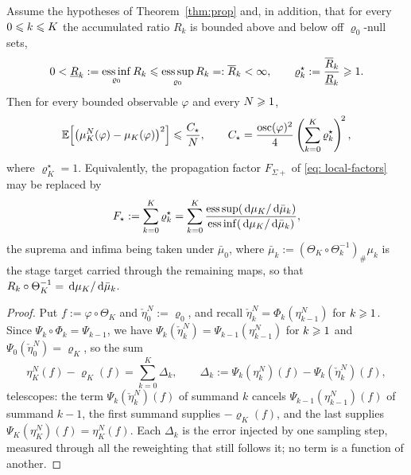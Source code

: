 \documentclass{article}
\begin{document}
{\begin{theorem}
\label{thm:prop-star}
Assume the hypotheses of Theorem~\ref{thm:prop} and, in addition, that for every $0\leqslant k\leqslant K$ the accumulated ratio $R_k$ is bounded above and below off $\varrho_0$-null sets,
\begin{equation*}
    0<\underline R_k:=\operatorname*{ess\,inf}_{\varrho_0}R_k
    \leqslant \operatorname*{ess\,sup}_{\varrho_0}R_k=:\overline R_k<\infty,
    \qquad
    \varrho^\star_k:=\frac{\overline R_k}{\underline R_k}\geqslant1 .
\end{equation*}
Then for every bounded observable $\varphi$ and every $N\geqslant1$,
\begin{equation}
    \mathbb E\Bigl[\bigl(\mu_K^N(\varphi)-\mu_K(\varphi)\bigr)^2\Bigr]\leqslant\frac{C_\star}{N},
    \qquad
    C_\star=\frac{\operatorname{osc}(\varphi)^2}{4}\left(\sum_{k=0}^{K}\varrho^\star_k\right)^{\!2},
    \label{eq: propagation-bound-star}
\end{equation}
where $\varrho^\star_K=1$. Equivalently, the propagation factor $F_{\Sigma+}$ of \eqref{eq: local-factors} may be replaced by
\begin{equation*}
    F_\star:=\sum_{k=0}^{K}\varrho^\star_k
    =\sum_{k=0}^{K}\frac{\operatorname*{ess\,sup}(\,\mathrm d\mu_K/\,\mathrm d\bar\mu_k)}{\operatorname*{ess\,inf}(\,\mathrm d\mu_K/\,\mathrm d\bar\mu_k)},
\end{equation*}
the suprema and infima being taken under $\bar\mu_0$, where $\bar\mu_k:=(\Theta_K\circ\Theta_k^{-1})_{\#}\mu_k$ is the stage target carried through the remaining maps, so that $R_k\circ\Theta_K^{-1}=\,\mathrm d\mu_K/\,\mathrm d\bar\mu_k$.
\end{theorem}

\begin{proof}
Put $f:=\varphi\circ\Theta_K$ and $\check\eta_0^N:=\varrho_0$, and recall $\check\eta_k^N=\Phi_k(\eta_{k-1}^N)$ for $k\geqslant1$. Since $\Psi_k\circ\Phi_k=\Psi_{k-1}$, we have $\Psi_k(\check\eta_k^N)=\Psi_{k-1}(\eta_{k-1}^N)$ for $k\geqslant1$ and $\Psi_0(\check\eta_0^N)=\varrho_K$, so the sum
\begin{equation*}
    \eta_K^N(f)-\varrho_K(f)
    =\sum_{k=0}^{K}\Delta_k,
    \qquad
    \Delta_k:=\Psi_k(\eta_k^N)(f)-\Psi_k(\check\eta_k^N)(f),
\end{equation*}
telescopes: the term $\Psi_k(\check\eta_k^N)(f)$ of summand $k$ cancels $\Psi_{k-1}(\eta_{k-1}^N)(f)$ of summand $k-1$, the first summand supplies $-\varrho_K(f)$, and the last supplies $\Psi_K(\eta_K^N)(f)=\eta_K^N(f)$. Each $\Delta_k$ is the error injected by one sampling step, measured through all the reweighting that still follows it; no term is a function of another.


\end{proof}}
\end{document}
